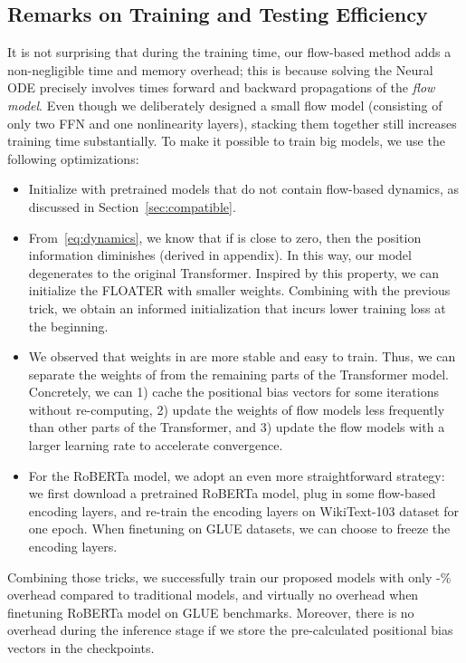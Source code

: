 \documentclass[11pt]{article}
\begin{document}
\subsection{Remarks on Training and Testing Efficiency}
It is not surprising that during the training time, our flow-based method adds a non-negligible time and memory overhead; this is because solving the Neural ODE precisely involves  times forward and backward propagations of the \emph{flow model}. Even though we deliberately designed a small flow model (consisting of only two FFN and one nonlinearity layers), stacking them together still increases training time substantially. To make it possible to train big models, we use the following optimizations:
\begin{itemize}[nosep,leftmargin=1em,labelwidth=*,align=left]
    \item Initialize with pretrained models that do not contain flow-based dynamics, as discussed in Section~\ref{sec:compatible}.
    \item From~\eqref{eq:dynamics}, we know that if  is close to zero, then the position information diminishes (derived in appendix). In this way, our model degenerates to the original Transformer. Inspired by this property, we can initialize the FLOATER with smaller weights. Combining with the previous trick, we obtain an informed initialization that incurs lower training loss at the beginning.
    \item We observed that weights in  are more stable and easy to train. Thus, we can separate the weights of  from the remaining parts of the Transformer model. Concretely, we can 1) cache the positional bias vectors for some iterations without re-computing, 2) update the weights of flow models less frequently than other parts of the Transformer, and 3) update the flow models with a larger learning rate to accelerate convergence.
    \item For the RoBERTa model, we adopt an even more straightforward strategy: we first download a pretrained RoBERTa model, plug in some flow-based encoding layers, and re-train the encoding layers on WikiText-103 dataset for one epoch. When finetuning on GLUE datasets, we can choose to freeze the encoding layers.
\end{itemize}
Combining those tricks, we successfully train our proposed models with only -\% overhead compared to traditional models, and virtually no overhead when finetuning RoBERTa model on GLUE benchmarks. Moreover, there is no overhead during the inference stage if we store the pre-calculated positional bias vectors in the checkpoints.
\end{document}
